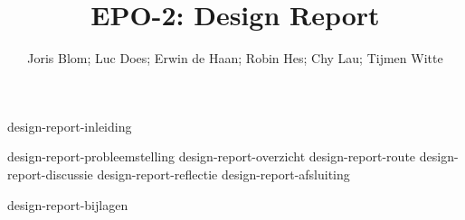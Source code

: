 \documentclass{report}
\title{EPO-2: Design Report}
\author{Joris Blom; Luc Does; Erwin de Haan; Robin Hes; Chy Lau; Tijmen Witte}
\begin{document}
\maketitle
\newpage
{}

{design-report-inleiding}
\tableofcontents

\newpage
{}

{design-report-probleemstelling}
{design-report-overzicht}
{design-report-route}
{design-report-discussie}
{design-report-reflectie}
{design-report-afsluiting}

\newpage
{}

\printbibliography
{design-report-bijlagen}
\end{document}
